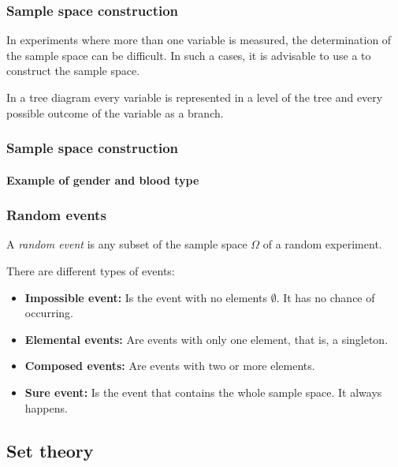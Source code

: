 \begin{frame}
\frametitle{Sample space construction}
In experiments where more than one variable is measured, the determination of the sample space can be difficult. 
In such a cases, it is advisable to use a  to construct the sample space. 

In a tree diagram every variable is represented in a level of the tree and every possible outcome of the variable as a
branch.
\end{frame}


\begin{frame}
\frametitle{Sample space construction}
\framesubtitle{Example of gender and blood type}

\begin{center}
\resizebox{0.8\textwidth}{!}{}
\end{center}
\end{frame}


\begin{frame}
\frametitle{Random events}
\begin{definition}
A \emph{random event} is any subset of the sample space $\Omega$ of a random experiment.
\end{definition}

There are different types of events:
\begin{itemize}
\item \textbf{Impossible event:} Is the event with no elements $\emptyset$. It has no chance of occurring.
\item \textbf{Elemental events:} Are events with only one element, that is, a singleton.
\item \textbf{Composed events:} Are events with two or more elements.
\item \textbf{Sure event:} Is the event that contains the whole sample space. It always happens.
\end{itemize}
\end{frame}


\subsection{Set theory}

